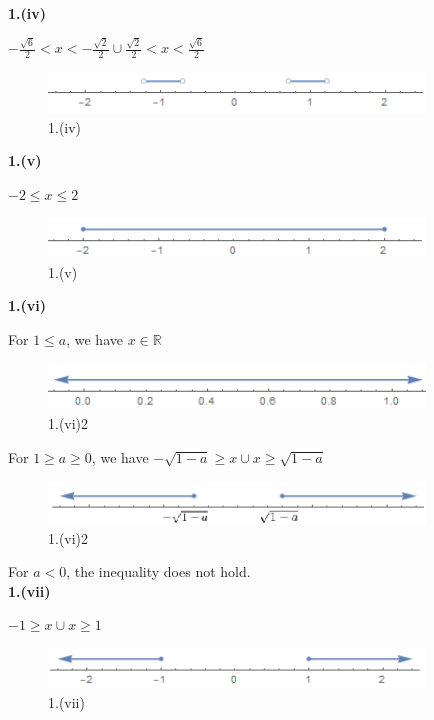 \documentclass[a4paper,12pt]{report}
\begin{document}
\pagebreak
\noindent
\textbf{1.(iv)}

\noindent
$-\frac{\sqrt{6}}{2}<x<-\frac{\sqrt{2}}{2}\cup \frac{\sqrt{2}}{2}<x<\frac{\sqrt{6}}{2}$ 

\begin{figure}[h]
  \centering
  \includegraphics[width=10cm]{Pics/Chap41(iv).png}
  \caption{1.(iv)}
\end{figure}

\noindent
\textbf{1.(v)}

\noindent
$-2\leq x\leq 2$ 

\begin{figure}[h]
  \centering
  \includegraphics[width=10cm]{Pics/Chap41(v).png}
  \caption{1.(v)}
\end{figure}

\pagebreak
\noindent
\textbf{1.(vi)}

\noindent
For $1\leq a$, we have $x\in \mathbb{R}$

\begin{figure}[h]
  \centering
  \includegraphics[width=10cm]{Pics/Chap41(vi)1.png}
  \caption{1.(vi)2}
\end{figure}

\noindent
For $1\geq a \geq 0$, we have $-\sqrt{1-a} \geq x \cup x\geq \sqrt{1-a}$

\begin{figure}[h]
  \centering
  \includegraphics[width=10cm]{Pics/Chap41(vi)2.png}
  \caption{1.(vi)2}
\end{figure}

\noindent
For $a < 0$, the inequality does not hold.\\ 

\noindent
\textbf{1.(vii)}

\noindent
$-1\geq x\cup x\geq 1$ 

\begin{figure}[h]
  \centering
  \includegraphics[width=10cm]{Pics/Chap41(vii).png}
  \caption{1.(vii)}
\end{figure}
\end{document}
